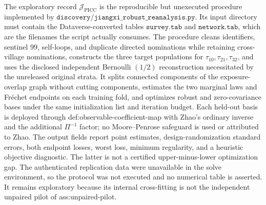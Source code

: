 The exploratory record \(\mathcal J_{\mathrm{PICC}}\) is the reproducible but unexecuted procedure implemented by \(\texttt{discovery/jiangxi\_robust\_reanalysis.py}\).  Its input directory must contain the Dataverse-converted tables \(\texttt{survey.tab}\) and \(\texttt{network.tab}\), which are the filenames the script actually consumes.  The procedure cleans identifiers, sentinel \(99\), self-loops, and duplicate directed nominations while retaining cross-village nominations, constructs the three target populations for \(\tau_{10},\tau_{21},\tau_{32}\), and uses the disclosed independent Bernoulli \((1/2)\) reconstruction necessitated by the unreleased original strata.  It splits connected components of the exposure-overlap graph without cutting components, estimates the two marginal laws and Fr\'echet endpoints on each training fold, and optimizes robust and zero-covariance bases under the same initialization list and iteration budget.  Each held-out basis is deployed through def:observable-coefficient-map with Zhao's ordinary inverse and the additional \(\Pi^{-1}\) factor; no Moore--Penrose safeguard is used or attributed to Zhao.  The output fields report point estimates, design-randomization standard errors, both endpoint losses, worst loss, minimum regularity, and a heuristic objective diagnostic.  The latter is not a certified upper-minus-lower optimization gap.  The authenticated replication data were unavailable in the solve environment, so the protocol was not executed and no numerical table is asserted.  It remains exploratory because its internal cross-fitting is not the independent unpaired pilot of ass:unpaired-pilot.